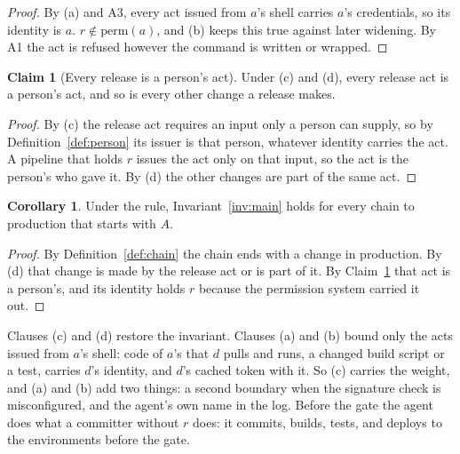 \documentclass[11pt]{article}
\theoremstyle{definition}
\newtheorem{claim}{Claim}
\newtheorem{corollary}{Corollary}
\begin{document}
\begin{proof}
By (a) and A3, every act issued from $a$'s shell carries $a$'s credentials, so its identity is $a$. $r \notin \mathrm{perm}(a)$, and (b) keeps this true against later widening. By A1 the act is refused however the command is written or wrapped.
\end{proof}

\begin{claim}[Every release is a person's act]
\label{cl:person}
Under (c) and (d), every release act is a person's act, and so is every other change a release makes.
\end{claim}

\begin{proof}
By (c) the release act requires an input only a person can supply, so by Definition~\ref{def:person} its issuer is that person, whatever identity carries the act. A pipeline that holds $r$ issues the act only on that input, so the act is the person's who gave it. By (d) the other changes are part of the same act.
\end{proof}

\begin{corollary}
\label{cor:main}
Under the rule, Invariant~\ref{inv:main} holds for every chain to production that starts with $A$.
\end{corollary}

\begin{proof}
By Definition~\ref{def:chain} the chain ends with a change in production. By (d) that change is made by the release act or is part of it. By Claim~\ref{cl:person} that act is a person's, and its identity holds $r$ because the permission system carried it out.
\end{proof}

Clauses (c) and (d) restore the invariant. Clauses (a) and (b) bound only the acts issued from $a$'s shell: code of $a$'s that $d$ pulls and runs, a changed build script or a test, carries $d$'s identity, and $d$'s cached token with it. So (c) carries the weight, and (a) and (b) add two things: a second boundary when the signature check is misconfigured, and the agent's own name in the log. Before the gate the agent does what a committer without $r$ does: it commits, builds, tests, and deploys to the environments before the gate.
\end{document}
